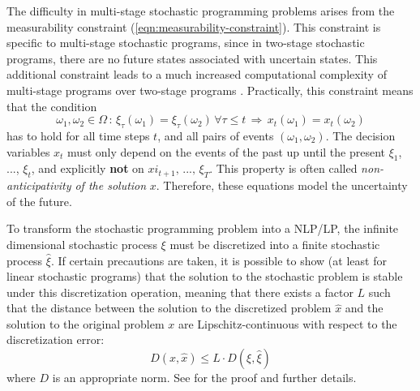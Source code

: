 \documentclass[a4paper, 12pt] {article}
\begin{document}
The difficulty in multi-stage stochastic programming problems arises from the measurability constraint (\ref{eqn:measurability-constraint}). This constraint is specific to multi-stage stochastic programs, since in two-stage stochastic programs, there are no future states associated with uncertain states. This additional constraint leads to a much increased computational complexity of multi-stage programs over two-stage programs \cite{Shapiro2005,Shapiro2008}. Practically, this constraint means that the condition
\begin{equation}
  \label{eq:mathematical-NAC}
  \omega_1,\omega_2\in \Omega \, : \, \xi_\tau(\omega_1) = \xi_\tau(\omega_2)\,\forall \tau\leq t\,\Rightarrow \, x_t(\omega_1) = x_t(\omega_2) 
\end{equation}
has to hold for all time steps $t$, and all pairs of events $(\omega_1,\omega_2)$. The decision variables $x_t$ must only depend on the events of the past up until the present $\xi_1$, ..., $\xi_t$, and explicitly \textbf{not} on $xi_{t+1},\, ...,\,\xi_T$. This property is often called \textit{non-anticipativity of the solution} $x$. Therefore, these equations model the uncertainty of the future.

To transform the stochastic programming problem into a NLP/LP, the infinite dimensional stochastic process $\xi$ must be discretized into a finite stochastic process $\hat{\xi}$. If certain precautions are taken, it is possible to show (at least for linear stochastic programs) that the solution to the stochastic problem is stable under this discretization operation, meaning that there exists a factor $L$ such that the distance between the solution to the discretized problem $\hat{x}$ and the solution to the original problem $x$ are Lipschitz-continuous with respect to the discretization error:
\begin{equation}
  D(x , \hat{x}) \leq L\cdot D(\xi,\hat{\xi})
\end{equation}
where $D$ is an appropriate norm. See \cite{Heitsch2009} for the proof and further details.
\end{document}
